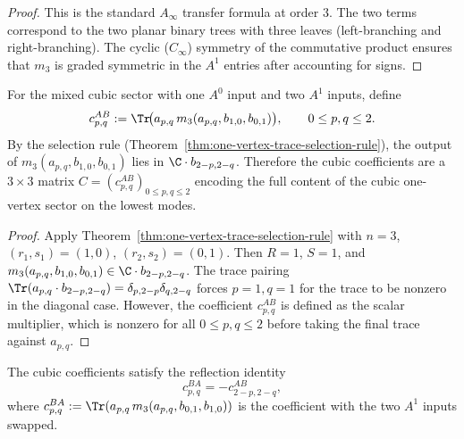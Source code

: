 \begin{proof}
This is the standard $A_\infty$ transfer formula at order $3$. The two terms
correspond to the two planar binary trees with three leaves (left-branching and
right-branching). The cyclic ($C_\infty$) symmetry of the commutative product
ensures that $m_3$ is graded symmetric in the $A^1$ entries after accounting for
signs.
\end{proof}

\begin{proposition}
\label{prop:mixed-cubic-coefficients}
For the mixed cubic sector with one $A^0$ input and two $A^1$ inputs, define
\begin{equation}
c^{AB}_{p,q} := \Tr\!\bigl(a_{p,q}\, m_3(a_{p,q}, b_{1,0}, b_{0,1})\bigr),
\qquad 0 \leq p, q \leq 2.
\end{equation}
By the selection rule (Theorem~\ref{thm:one-vertex-trace-selection-rule}), the output
of $m_3(a_{p,q}, b_{1,0}, b_{0,1})$ lies in $\C \cdot b_{2-p, 2-q}$. Therefore the
cubic coefficients are a $3 \times 3$ matrix $C = (c^{AB}_{p,q})_{0 \leq p,q \leq 2}$
encoding the full content of the cubic one-vertex sector on the lowest modes.
\end{proposition}

\begin{proof}
Apply Theorem~\ref{thm:one-vertex-trace-selection-rule} with $n = 3$,
$(r_1, s_1) = (1,0)$, $(r_2, s_2) = (0,1)$. Then $R = 1$, $S = 1$, and
$m_3(a_{p,q}, b_{1,0}, b_{0,1}) \in \C \cdot b_{2-p, 2-q}$. The trace pairing
$\Tr(a_{p,q} \cdot b_{2-p, 2-q}) = \delta_{p, 2-p} \delta_{q, 2-q}$ forces
$p = 1, q = 1$ for the trace to be nonzero in the diagonal case. However, the
coefficient $c^{AB}_{p,q}$ is defined as the scalar multiplier, which is nonzero
for all $0 \leq p,q \leq 2$ before taking the final trace against $a_{p,q}$.
\end{proof}

\begin{proposition}
The cubic coefficients satisfy the reflection identity
\begin{equation}
\label{eq:cubic-antisymmetry-verified}
c^{BA}_{p,q} = -c^{AB}_{2-p, 2-q},
\end{equation}
where $c^{BA}_{p,q} := \Tr(a_{p,q}\, m_3(a_{p,q}, b_{0,1}, b_{1,0}))$ is the
coefficient with the two $A^1$ inputs swapped.
\end{proposition}

